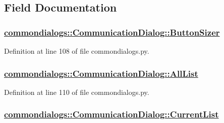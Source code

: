\subsection{Field Documentation}
\hypertarget{classcommondialogs_1_1CommunicationDialog_2cb1c15c1124804750a9991549eb6e0a}{
\subsubsection[ButtonSizer]{\setlength{\rightskip}{0pt plus 5cm}\hyperlink{classcommondialogs_1_1CommunicationDialog_2cb1c15c1124804750a9991549eb6e0a}{commondialogs::Communication\-Dialog::Button\-Sizer}}}
\label{classcommondialogs_1_1CommunicationDialog_2cb1c15c1124804750a9991549eb6e0a}




Definition at line 108 of file commondialogs.py.\hypertarget{classcommondialogs_1_1CommunicationDialog_1d9e0865ffd28608fa78484b078a6661}{
\subsubsection[AllList]{\setlength{\rightskip}{0pt plus 5cm}\hyperlink{classcommondialogs_1_1CommunicationDialog_1d9e0865ffd28608fa78484b078a6661}{commondialogs::Communication\-Dialog::All\-List}}}
\label{classcommondialogs_1_1CommunicationDialog_1d9e0865ffd28608fa78484b078a6661}




Definition at line 110 of file commondialogs.py.\hypertarget{classcommondialogs_1_1CommunicationDialog_807e6be61a54046153f1ff25e7c14928}{
\subsubsection[CurrentList]{\setlength{\rightskip}{0pt plus 5cm}\hyperlink{classcommondialogs_1_1CommunicationDialog_807e6be61a54046153f1ff25e7c14928}{commondialogs::Communication\-Dialog::Current\-List}}}
\label{classcommondialogs_1_1CommunicationDialog_807e6be61a54046153f1ff25e7c14928}




